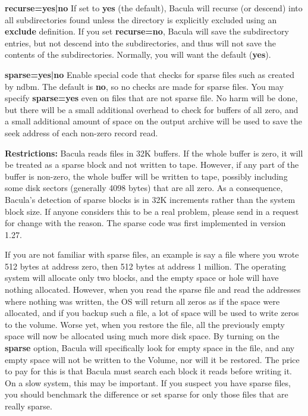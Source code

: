 \begin{description}
\begin{description}
\item {\bf recurse=yes|no}
If set to {\bf yes} (the default),  Bacula will recurse (or descend) into all
subdirectories  found unless the directory is explicitly excluded  using an
{\bf exclude} definition.  If you set  {\bf recurse=no}, Bacula will save the
subdirectory entries,  but not descend into the subdirectories, and thus  will
not save the contents of the subdirectories. Normally, you  will want the
default ({\bf yes}).  

\item {\bf sparse=yes|no}
Enable special code that checks for sparse files  such as created by ndbm. The
default is {\bf no}, so no checks  are made for sparse files. You may specify
{\bf sparse=yes} even  on files that are not sparse file. No harm will be
done, but there  will be a small additional overhead to check for buffers of 
all zero, and a small additional amount of space on the output  archive will
be used to save the seek address of each non-zero  record read.  

{\bf Restrictions:} Bacula reads files in 32K buffers.  If the whole buffer is
zero, it will be treated as a sparse  block and not written to tape. However,
if any part of the buffer  is non-zero, the whole buffer will be written to
tape, possibly  including some disk sectors (generally 4098 bytes) that are
all  zero. As a consequence, Bacula's detection of sparse blocks is in  32K
increments rather than the system block size. If anyone  considers this to be
a real problem, please send in a request  for change with the reason. The
sparse code was first  implemented in version 1.27.  

If you are not familiar with sparse files, an example is  say a file where you
wrote 512 bytes at address zero, then  512 bytes at address 1 million. The
operating system will  allocate only two blocks, and the empty space or hole 
will have nothing allocated. However, when you read the  sparse file and read
the addresses where nothing was written,  the OS will return all zeros as if
the space were allocated,  and if you backup such a file, a lot of space will
be used  to write zeros to the volume. Worse yet, when you restore  the file,
all the previously empty space will now be allocated  using much more disk
space. By turning on the {\bf sparse}  option, Bacula will specifically look
for empty space in  the file, and any empty space will not be written to the
Volume,  nor will it be restored. The price to pay for this is that  Bacula
must search each block it reads before writing it.  On a slow system, this may
be important. If you suspect  you have sparse files, you should benchmark the
difference  or set sparse for only those files that are really sparse. 
\label{readfifo}


\end{description}
\end{description}
